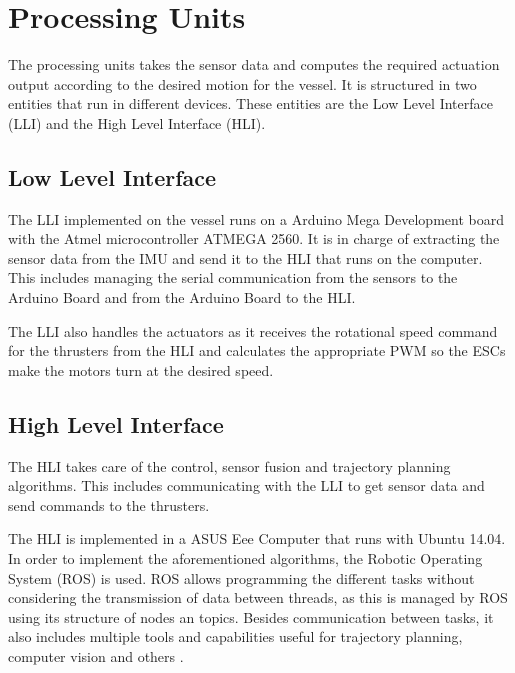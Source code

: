\section{Processing Units}\label{sec:ControlComputation}
The processing units takes the sensor data and computes the required actuation output according to the desired motion for the vessel. It is structured in two entities that run in different devices. These entities are the Low Level Interface (LLI) and the High Level Interface (HLI).

\subsection{Low Level Interface} 

The LLI implemented on the vessel runs on a Arduino Mega Development board with the Atmel microcontroller ATMEGA 2560. It is in charge of extracting the sensor data from the IMU and send it to the HLI that runs on the computer. This includes managing the serial communication from the sensors to the Arduino Board and from the Arduino Board to the HLI. 

The LLI also handles the actuators as it receives the rotational speed command for the thrusters from the HLI and calculates the appropriate PWM so the ESCs make the motors turn at the desired speed.

\subsection{High Level Interface}

The HLI takes care of the control, sensor fusion and trajectory planning algorithms. This includes communicating with the LLI to get sensor data and send commands to the thrusters. 

The HLI is implemented in a ASUS Eee Computer \cite{asus} that runs with Ubuntu 14.04. In order to implement the aforementioned algorithms, the Robotic Operating System (ROS) is used. ROS allows programming the different tasks without considering the transmission of data between threads, as this is managed by ROS using its structure of nodes an topics. Besides communication between tasks, it also includes multiple tools and capabilities useful for trajectory planning, computer vision and others \cite{ROS}.